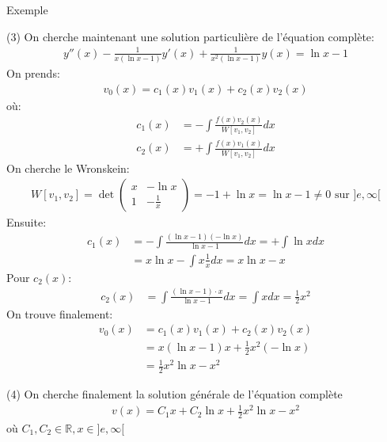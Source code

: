 \begin{parag}{Exemple}
   \begin{subparag}{(3)}
       On cherche maintenant une solution particulière de l'équation complète:
       \begin{align*}
           y''(x) - \frac{1}{x(\ln x - 1)}y'(x) + \frac{1}{x^2(\ln x -1)} y(x) = \ln x - 1
       \end{align*}
       On prends:
       \begin{align*}
           v_0 ( x) = c_1(x)v_1(x) + c_2(x)v_2(x) 
       \end{align*}
       où:
       \begin{align*}
           c_1(x) &= -\int \frac{f(x)v_2(x)}{W[v_1, v_2]}dx \\
           c_2(x) &= +\int \frac{f(x) v_1(x)}{W[v_1, v_2]}dx
       \end{align*}
       On cherche le Wronskein:
       \begin{align*}
           W[v_1, v_2] = \det \begin{pmatrix}
               x & - \ln x \\
               1 & - \frac{1}{x}
           \end{pmatrix} = -1 + \ln x = \ln x - 1 \neq 0 \text{ sur } ]e, \infty[
       \end{align*}
       Ensuite:
       \begin{align*}
           c_1(x) &= -\int \frac{(\ln x - 1)(-\ln x)}{\ln x - 1}dx = + \int \ln x dx\\ &= x \ln x - \int x \frac{1}{x} dx = x \ln x - x
       \end{align*}
       Pour $c_2(x)$:
       \begin{align*}
           c_2(x) &= \int \frac{(\ln x -1) \cdot x}{\ln x - 1} dx = \int x dx = \frac{1}{2}x^2
       \end{align*}
       On trouve finalement:
       \begin{align*}
           v_0(x) &= c_1(x)v_1(x) + c_2(x)v_2(x)\\ &= x(\ln x - 1)x + \frac{1}{2}x^2 (-\ln x)\\ &= \frac{1}{2}x^2 \ln x - x^2
       \end{align*}
   \end{subparag} 
   \begin{subparag}{(4)}
       On cherche finalement la solution générale de l'équation complète
       \begin{align*}
           v(x) = C_1x + C_2 \ln x + \frac{1}{2}x^2 \ln x - x^2
       \end{align*}
       où $C_1, C_2 \in \mathbb{R}, x \in ] e, \infty[$
       
       
   \end{subparag}

\end{parag}
